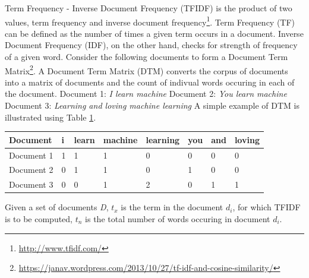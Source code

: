 \documentclass[a4paper,12pt,twoside]{report}
\begin{document}
Term Frequency - Inverse Document Frequency (TFIDF) is the product of two values, term frequency and inverse document frequency\footnote{\url{http://www.tfidf.com/}}. Term Frequency (TF) can be defined as the number of times a given term occurs in a document. Inverse Document Frequency (IDF), on the other hand, checks for strength of frequency of a given word. 
\newline \newline
Consider the following documents to form a Document Term Matrix\footnote{\url{https://janav.wordpress.com/2013/10/27/tf-idf-and-cosine-similarity/}}.  A Document Term Matrix (DTM) converts the corpus of documents into a matrix of documents and the count of indivual words occuring in each of the document. 
\newline 
Document 1: \textit{I learn machine} 
\newline \newline
Document 2: \textit{You learn machine} 
\newline \newline
Document 3: \textit{Learning and loving machine learning}
\newline \newline
A simple example of DTM is illustrated using Table \ref{tab:dtmExample}. 
\begin{table} %
    \centering
    \begin{adjustbox}{max width=\columnwidth}
    \def\arraystretch{1} %
    \begin{tabular}{p{3cm} p{2cm} p{2cm} p{2cm} p{2cm} p{2cm} p{2cm} p{2cm}}
        \toprule
        \textbf{Document} & \textbf{i} & \textbf{learn} & \textbf{machine} & \textbf{learning} & \textbf{you} & \textbf{and} & \textbf{loving}\\
        \midrule
			Document 1 & 1 & 1 & 1 & 0 & 0 & 0 & 0\\
			Document 2 & 0 & 1 & 1 & 0 & 1 & 0 & 0 \\ 
			Document 3 & 0 & 0 & 1 & 2 & 0 & 1 & 1 \\
        \midrule
    \end{tabular}
    \end{adjustbox}
    \label{tab:dtmExample}
\end{table}
Given a set of documents \textit{D}, \textit{$t_x$} is the term in the document \textit{$d_i$}, for which TFIDF is to be computed, \textit{$t_n$} is the total number of words occuring in document \textit{$d_i$}.
\end{document}
